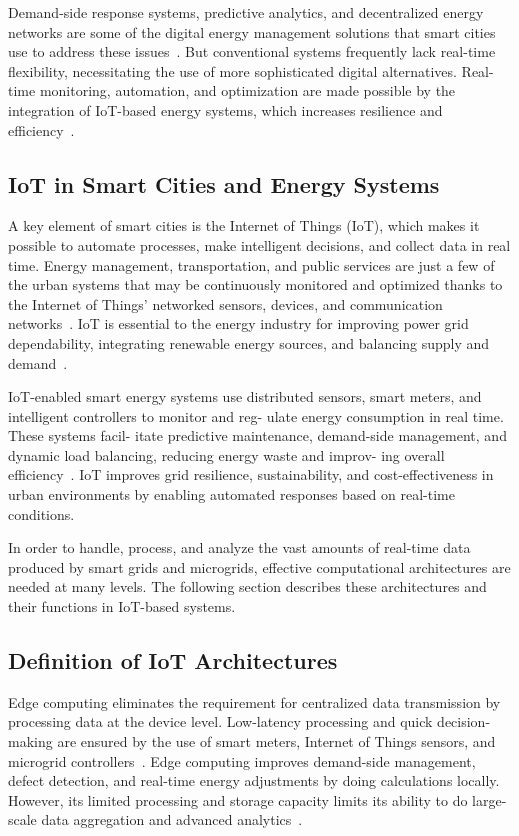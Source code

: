 \documentclass[conference]{IEEEtran}
\begin{document}
Demand-side response systems, predictive analytics, and decentralized energy networks are some of the digital energy management solutions that smart cities use to address these issues~\cite{saeed_practical_2023}. But conventional systems frequently lack real-time flexibility, necessitating the use of more sophisticated digital alternatives. Real-time monitoring, automation, and optimization are made possible by the integration of IoT-based energy systems, which increases resilience and efficiency~\cite{10474733}.

\subsection{IoT in Smart Cities and Energy Systems}

A key element of smart cities is the Internet of Things (IoT), which makes it possible to automate processes, make intelligent decisions, and collect data in real time. Energy management, transportation, and public services are just a few of the urban systems that may be continuously monitored and optimized thanks to the Internet of Things' networked sensors, devices, and communication networks~\cite{smartcities4020024}. IoT is essential to the energy industry for improving power grid dependability, integrating renewable energy sources, and balancing supply and demand~\cite{en14185976}.  

IoT-enabled smart energy systems use distributed sensors, smart meters, and intelligent controllers to monitor and reg- ulate energy consumption in real time. These systems facil- itate predictive maintenance, demand-side management, and dynamic load balancing, reducing energy waste and improv- ing overall efficiency~\cite{10474733}. IoT improves grid resilience, sustainability, and cost-effectiveness in urban environments by enabling automated responses based on real-time conditions.  

In order to handle, process, and analyze the vast amounts of real-time data produced by smart grids and microgrids, effective computational architectures are needed at many levels. The following section describes these architectures and their functions in IoT-based systems.

\subsection{Definition of IoT Architectures}

Edge computing eliminates the requirement for centralized data transmission by processing data at the device level. Low-latency processing and quick decision-making are ensured by the use of smart meters, Internet of Things sensors, and microgrid controllers~\cite{smartcities4020024}. Edge computing improves demand-side management, defect detection, and real-time energy adjustments by doing calculations locally. However, its limited processing and storage capacity limits its ability to do large-scale data aggregation and advanced analytics~\cite{smartcities4020024}.  
\end{document}
